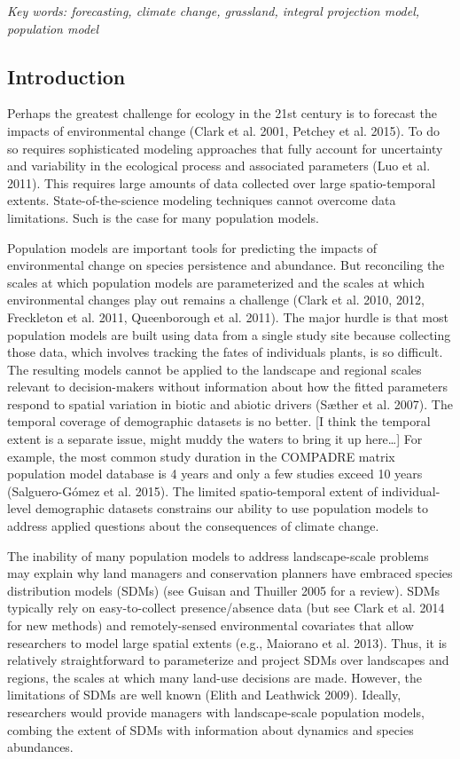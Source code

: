 \documentclass[12pt,]{article}
\begin{document}
\emph{Key words: forecasting, climate change, grassland, integral
projection model, population model}

\subsection{Introduction}\label{introduction}

Perhaps the greatest challenge for ecology in the 21st century is to
forecast the impacts of environmental change (Clark et al. 2001, Petchey
et al. 2015). To do so requires sophisticated modeling approaches that
fully account for uncertainty and variability in the ecological process
and associated parameters (Luo et al. 2011). This requires large amounts
of data collected over large spatio-temporal extents.
State-of-the-science modeling techniques cannot overcome data
limitations. Such is the case for many population models.

Population models are important tools for predicting the impacts of
environmental change on species persistence and abundance. But
reconciling the scales at which population models are parameterized and
the scales at which environmental changes play out remains a challenge
(Clark et al. 2010, 2012, Freckleton et al. 2011, Queenborough et al.
2011). The major hurdle is that most population models are built using
data from a single study site because collecting those data, which
involves tracking the fates of individuals plants, is so difficult. The
resulting models cannot be applied to the landscape and regional scales
relevant to decision-makers without information about how the fitted
parameters respond to spatial variation in biotic and abiotic drivers
(Sæther et al. 2007). The temporal coverage of demographic datasets is
no better. {[}I think the temporal extent is a separate issue, might
muddy the waters to bring it up here\ldots{}{]} For example, the most
common study duration in the COMPADRE matrix population model database
is 4 years and only a few studies exceed 10 years (Salguero-Gómez et al.
2015). The limited spatio-temporal extent of individual-level
demographic datasets constrains our ability to use population models to
address applied questions about the consequences of climate change.

The inability of many population models to address landscape-scale
problems may explain why land managers and conservation planners have
embraced species distribution models (SDMs) (see Guisan and Thuiller
2005 for a review). SDMs typically rely on easy-to-collect
presence/absence data (but see Clark et al. 2014 for new methods) and
remotely-sensed environmental covariates that allow researchers to model
large spatial extents (e.g., Maiorano et al. 2013). Thus, it is
relatively straightforward to parameterize and project SDMs over
landscapes and regions, the scales at which many land-use decisions are
made. However, the limitations of SDMs are well known (Elith and
Leathwick 2009). Ideally, researchers would provide managers with
landscape-scale population models, combing the extent of SDMs with
information about dynamics and species abundances.
\end{document}
